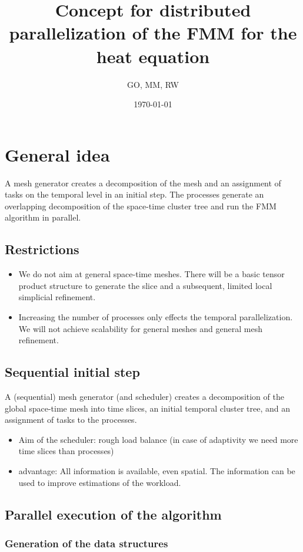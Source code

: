 \documentclass[a4paper,11pt]{article}
\title{\sffamily\bfseries Concept for distributed parallelization of the FMM for the heat equation}
\author{GO, MM, RW}
\date{\today}
\theoremstyle{plain}
\theoremstyle{definition}
\theoremstyle{remark}
\begin{document}
\maketitle

\section{General idea}
A mesh generator creates a decomposition of the mesh and
an assignment of tasks on the temporal level in an initial step. The processes
generate an overlapping decomposition of the space-time cluster tree and run
the FMM algorithm in parallel.
\subsection{Restrictions}
\begin{itemize}
\item  We do not aim at general space-time meshes. There will be a basic
  tensor product structure to generate the slice and a subsequent, limited local
  simplicial refinement.
\item Increasing the number of processes only effects the temporal
  parallelization. We will not achieve scalability for general meshes and general
  mesh refinement.
\end{itemize}
\subsection{Sequential initial step}
 A (sequential) mesh generator (and scheduler) creates a decomposition of the
 global space-time mesh into time slices, an initial temporal cluster tree, and an
 assignment of tasks to the processes.
\begin{itemize}
\item Aim of the scheduler: rough load balance (in case of adaptivity we need more time slices
  than processes)
\item advantage: All  information is available, even spatial. The information can
  be used to improve estimations of the workload.
\end{itemize}

\subsection{Parallel execution of the algorithm}

\subsubsection{Generation of the data structures}
\end{document}

